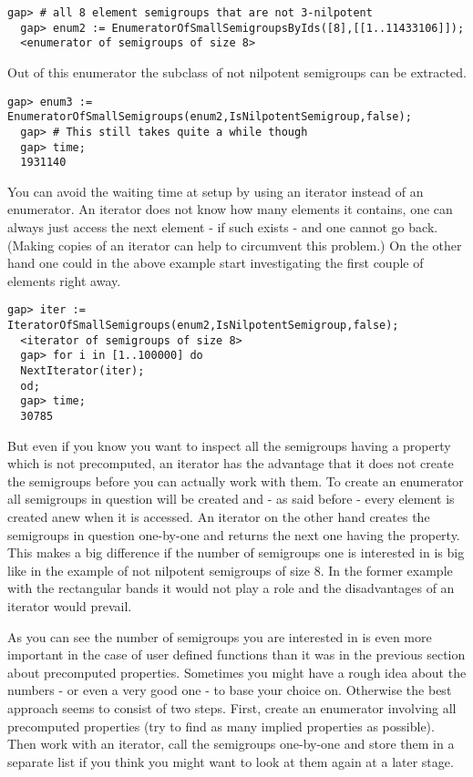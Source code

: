 \documentclass[a4paper,11pt]{report}
\begin{document}
{{{\begin{Verbatim}[fontsize=\small,frame=single,label=Example]
  gap> # all 8 element semigroups that are not 3-nilpotent
  gap> enum2 := EnumeratorOfSmallSemigroupsByIds([8],[[1..11433106]]);
  <enumerator of semigroups of size 8>
\end{Verbatim}
 Out of this enumerator the subclass of not nilpotent semigroups can be
extracted. 
\begin{Verbatim}[fontsize=\small,frame=single,label=Example]
  gap> enum3 := EnumeratorOfSmallSemigroups(enum2,IsNilpotentSemigroup,false);
  gap> # This still takes quite a while though
  gap> time;
  1931140
\end{Verbatim}
 You can avoid the waiting time at setup by using an iterator instead of an
enumerator. An iterator does not know how many elements it contains, one can
always just access the next element - if such exists - and one cannot go back.
(Making copies of an iterator can help to circumvent this problem.) On the
other hand one could in the above example start investigating the first couple
of elements right away. 
\begin{Verbatim}[fontsize=\small,frame=single,label=Example]
  gap> iter := IteratorOfSmallSemigroups(enum2,IsNilpotentSemigroup,false);
  <iterator of semigroups of size 8>
  gap> for i in [1..100000] do 
  NextIterator(iter);
  od;
  gap> time;
  30785
\end{Verbatim}
 But even if you know you want to inspect all the semigroups having a property
which is not precomputed, an iterator has the advantage that it does not
create the semigroups before you can actually work with them. To create an
enumerator all semigroups in question will be created and - as said before -
every element is created anew when it is accessed. An iterator on the other
hand creates the semigroups in question one-by-one and returns the next one
having the property. This makes a big difference if the number of semigroups
one is interested in is big like in the example of not nilpotent semigroups of
size 8. In the former example with the rectangular bands it would not play a
role and the disadvantages of an iterator would prevail. 

 As you can see the number of semigroups you are interested in is even more
important in the case of user defined functions than it was in the previous
section about precomputed properties. Sometimes you might have a rough idea
about the numbers - or even a very good one - to base your choice on.
Otherwise the best approach seems to consist of two steps. First, create an
enumerator involving all precomputed properties (try to find as many implied
properties as possible). Then work with an iterator, call the semigroups
one-by-one and store them in a separate list if you think you might want to
look at them again at a later stage. 

}}}
\end{document}
